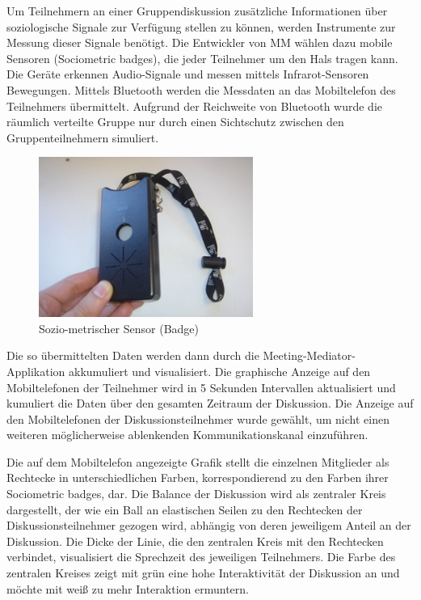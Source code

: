 Um Teilnehmern an einer Gruppendiskussion zusätzliche Informationen über
soziologische Signale zur Verfügung stellen zu können, werden Instrumente zur
Messung dieser Signale benötigt. Die Entwickler von MM wählen dazu mobile
Sensoren (Sociometric badges), die jeder Teilnehmer um den Hals tragen kann.
Die Geräte erkennen Audio-Signale und messen mittels Infrarot-Sensoren
Bewegungen. Mittels Bluetooth werden die Messdaten an das Mobiltelefon des
Teilnehmers übermittelt. Aufgrund der Reichweite von Bluetooth wurde die
räumlich verteilte Gruppe nur durch einen Sichtschutz zwischen den
Gruppenteilnehmern simuliert.

\begin{figure}[htp]
\centering
\includegraphics[width=7cm]{sociometricbadge.jpg}
\caption{Sozio-metrischer Sensor (Badge)}
\end{figure}

Die so übermittelten Daten werden dann durch die Meeting-Mediator-Applikation
akkumuliert und visualisiert.
Die graphische Anzeige auf den Mobiltelefonen der Teilnehmer wird in 5 Sekunden
Intervallen aktualisiert und kumuliert die Daten über den gesamten Zeitraum der
Diskussion.
Die Anzeige auf den Mobiltelefonen der Diskussionsteilnehmer wurde gewählt, um
nicht einen weiteren mög\-li\-cher\-wei\-se ablenkenden Kommunikationskanal
einzuführen.

Die auf dem Mobiltelefon angezeigte Grafik stellt die einzelnen Mitglieder als
Rechtecke in unterschiedlichen Farben, korrespondierend zu den Farben ihrer
Sociometric badges, dar. Die Balance der Diskussion wird als zentraler Kreis
dargestellt, der wie ein Ball an elastischen Seilen zu den Rechtecken der
Diskussionsteilnehmer gezogen wird, abhängig von deren jeweiligem Anteil an der
Diskussion. Die Dicke der Linie, die den zentralen Kreis mit den Rechtecken
verbindet, visualisiert die Sprechzeit des jeweiligen Teilnehmers. Die Farbe des
zentralen Kreises zeigt mit grün eine hohe Interaktivität der Diskussion an und
möchte mit weiß zu mehr Interaktion ermuntern.


